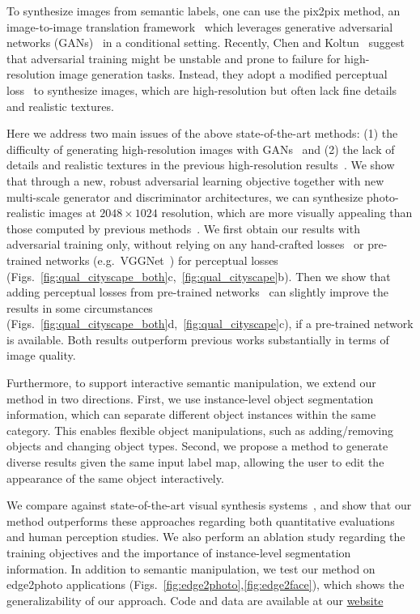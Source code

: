 \documentclass[10pt,twocolumn,letterpaper]{article}
\newcommand{\ck}{Chen and Koltun~\cite{chen2017photographic}\xspace}
\newcommand{\pp}{pix2pix\xspace}
\begin{document}
To synthesize images from semantic labels, one can use the \pp method, an image-to-image translation framework~\cite{isola2016image} which leverages generative adversarial networks (GANs)~\cite{goodfellow2014generative} in a conditional setting. Recently, \ck suggest that adversarial training might be unstable and prone to failure for high-resolution image generation tasks. Instead, they adopt a modified perceptual loss~\cite{gatys2016image,dosovitskiy2016generating,johnson2016perceptual} to synthesize images, which are high-resolution but often lack fine details and realistic textures.

Here we address two main issues of the above state-of-the-art methods: (1) the difficulty of generating high-resolution images with GANs~\cite{isola2016image} and (2) the lack of details and realistic textures in the previous high-resolution results~\cite{chen2017photographic}. We show that through a new, robust adversarial learning objective together with new multi-scale generator and discriminator architectures, we can synthesize photo-realistic images at $2048\times 1024$ resolution, which are more visually appealing than those computed by previous methods~\cite{isola2016image,chen2017photographic}. 
We first obtain our results with adversarial training only, without relying on any hand-crafted losses~\cite{rudin1992nonlinear} or pre-trained networks (e.g.\ VGGNet~\cite{simonyan2014very}) for perceptual losses~\cite{dosovitskiy2016generating,johnson2016perceptual} (Figs.~\ref{fig:qual_cityscape_both}c,~\ref{fig:qual_cityscape}b). Then we show that adding perceptual losses from pre-trained networks~\cite{simonyan2014very} can slightly improve the results in some circumstances (Figs.~\ref{fig:qual_cityscape_both}d,~\ref{fig:qual_cityscape}c), if a pre-trained network is available. Both results outperform previous works substantially in terms of image quality.

Furthermore, to support interactive semantic manipulation, we extend our method in two directions. First, we use instance-level object segmentation information, which can separate different object instances within the same category.
This enables flexible object manipulations, such as adding/removing objects and changing object types. Second, we propose a method to generate diverse results given the same input label map, allowing the user to edit the appearance of the same object interactively.

We compare against state-of-the-art visual synthesis systems~\cite{chen2017photographic,isola2016image}, and show that our method outperforms these approaches regarding both quantitative evaluations and human perception studies. We also perform an ablation study regarding the training objectives and the importance of instance-level segmentation information. 
In addition to semantic manipulation, we test our method on edge2photo applications (Figs.~\ref{fig:edge2photo},\ref{fig:edge2face}), which shows the generalizability of our approach.
Code and data are available at our \href{https://tcwang0509.github.io/pix2pixHD/}{website}
\end{document}
